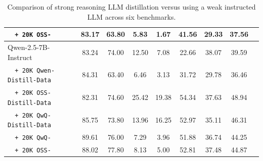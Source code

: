 \begin{table}[t]
{\begin{tabular}{lcccccccc}
    \texttt{\ \ + 20K OSS-\method{}} & 83.17 & 63.80 & 5.83 & 1.67 & 41.56 & 29.33 & 37.56 \\
    \midrule
    Qwen-2.5-7B-Instruct & 83.24 & 74.00 & 12.50 & 7.08 & 22.66 & 38.07 & 39.59 \\
    \texttt{\ \ + 20K Qwen-Distill-Data} & 84.31 & 63.40 & 6.46 & 3.13 & 31.72 & 29.78 & 36.46 \\
    \texttt{\ \ + 20K OSS-Distill-Data} & 82.31 & 74.60 & 25.42 & 19.38 & 54.34 & 37.63 & 48.94 \\
    \texttt{\ \ + 20K QwQ-Distill-Data} & 85.75 & 73.80 & 13.96 & 16.25 & 52.97 & 35.11 & 46.31 \\
    \texttt{\ \ + 20K QwQ-\method{}} & 89.61 & 76.00 & 7.29 & 3.96 & 51.88 & 36.74 & 44.25 \\
    \texttt{\ \ + 20K OSS-\method{}} & 88.02 & 77.80 & 8.13 & 5.00 & 52.81 & 37.48 & 44.87 \\
\bottomrule
\end{tabular}
}
\caption{Comparison of strong reasoning LLM distillation versus \method{} using a weak instructed LLM across six benchmarks.}
\label{tab:full_method_result}
\end{table}



\begin{table}[t]
\centering
{}
\caption{The effectiveness analysis of \method{} methods based on different instruct models.}
\label{tab:different_llm_method}
\end{table}



